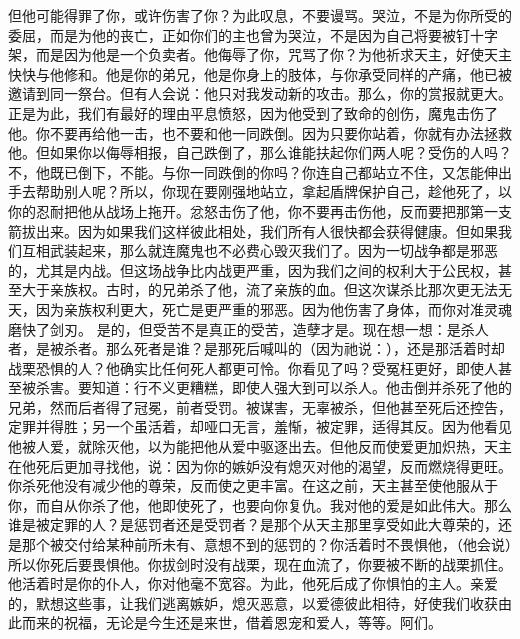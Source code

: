 但他可能得罪了你，或许伤害了你？为此叹息，不要谩骂。哭泣，不是为你所受的委屈，而是为他的丧亡，正如你们的主也曾为哭泣，不是因为自己将要被钉十字架，而是因为他是一个负卖者。他侮辱了你，咒骂了你？为他祈求天主，好使天主快快与他修和。他是你的弟兄，他是你身上的肢体，与你承受同样的产痛，他已被邀请到同一祭台。但有人会说：他只对我发动新的攻击。那么，你的赏报就更大。正是为此，我们有最好的理由平息愤怒，因为他受到了致命的创伤，魔鬼击伤了他。你不要再给他一击，也不要和他一同跌倒。因为只要你站着，你就有办法拯救他。但如果你以侮辱相报，自己跌倒了，那么谁能扶起你们两人呢？受伤的人吗？不，他既已倒下，不能。与你一同跌倒的你吗？你连自己都站立不住，又怎能伸出手去帮助别人呢？所以，你现在要刚强地站立，拿起盾牌保护自己，趁他死了，以你的忍耐把他从战场上拖开。忿怒击伤了他，你不要再击伤他，反而要把那第一支箭拔出来。因为如果我们这样彼此相处，我们所有人很快都会获得健康。但如果我们互相武装起来，那么就连魔鬼也不必费心毁灭我们了。因为一切战争都是邪恶的，尤其是内战。但这场战争比内战更严重，因为我们之间的权利大于公民权，甚至大于亲族权。古时，的兄弟杀了他，流了亲族的血。但这次谋杀比那次更无法无天，因为亲族权利更大，死亡是更严重的邪恶。因为他伤害了身体，而你对准灵魂磨快了剑刃。 是的，但受苦不是真正的受苦，造孽才是。现在想一想：是杀人者，是被杀者。那么死者是谁？是那死后喊叫的（因为祂说：），还是那活着时却战栗恐惧的人？他确实比任何死人都更可怜。你看见了吗？受冤枉更好，即使人甚至被杀害。要知道：行不义更糟糕，即使人强大到可以杀人。他击倒并杀死了他的兄弟，然而后者得了冠冕，前者受罚。被谋害，无辜被杀，但他甚至死后还控告，定罪并得胜；另一个虽活着，却哑口无言，羞惭，被定罪，适得其反。因为他看见他被人爱，就除灭他，以为能把他从爱中驱逐出去。但他反而使爱更加炽热，天主在他死后更加寻找他，说：因为你的嫉妒没有熄灭对他的渴望，反而燃烧得更旺。你杀死他没有减少他的尊荣，反而使之更丰富。在这之前，天主甚至使他服从于你，而自从你杀了他，他即使死了，也要向你复仇。我对他的爱是如此伟大。那么谁是被定罪的人？是惩罚者还是受罚者？是那个从天主那里享受如此大尊荣的，还是那个被交付给某种前所未有、意想不到的惩罚的？你活着时不畏惧他，（他会说）所以你死后要畏惧他。你拔剑时没有战栗，现在血流了，你要被不断的战栗抓住。他活着时是你的仆人，你对他毫不宽容。为此，他死后成了你惧怕的主人。亲爱的，默想这些事，让我们逃离嫉妒，熄灭恶意，以爱德彼此相待，好使我们收获由此而来的祝福，无论是今生还是来世，借着恩宠和爱人，等等。阿们。\par

